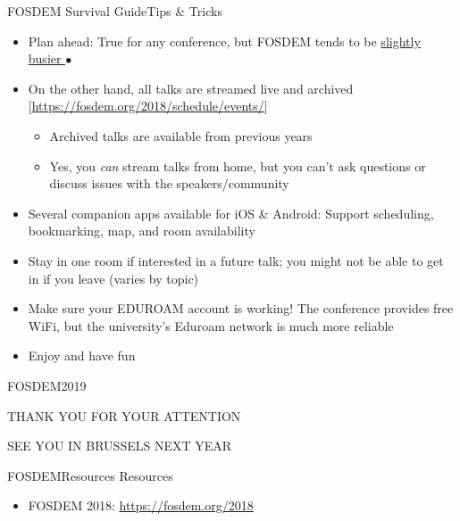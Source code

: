 \documentclass[10pt]{beamer}
\begin{document}
\begin{frame}{FOSDEM Survival Guide}{Tips \& Tricks}
    \begin{itemize}
        \item Plan ahead: True for any conference, but FOSDEM tends to be \href{./photos/room-full.jpg}{slightly busier $\bullet$}
        \item On the other hand, all talks are streamed live and archived [\url{https://fosdem.org/2018/schedule/events/}]
            \begin{itemize}
                \item Archived talks are available from previous years
                \item Yes, you \emph{can} stream talks from home, but you can't ask questions or discuss issues with the speakers/community
            \end{itemize}
        \item Several companion apps available for iOS \& Android: Support scheduling, bookmarking, map, and room availability
        \item Stay in one room if interested in a future talk; you might not be able to get in if you leave (varies by topic)
        \item Make sure your EDUROAM account is working! The conference provides free WiFi, but the university's Eduroam network is much more reliable
        \item Enjoy and have fun
    \end{itemize}
\end{frame}

\begin{frame}{FOSDEM}{2019}
    \begin{center}
        THANK YOU FOR YOUR ATTENTION

        SEE YOU IN BRUSSELS NEXT YEAR
    \end{center}
\end{frame}

\begin{frame}{FOSDEM}{Resources}
    Resources

    \begin{itemize}
        \item FOSDEM 2018: \url{https://fosdem.org/2018}
    \end{itemize}
\end{frame}
\end{document}
